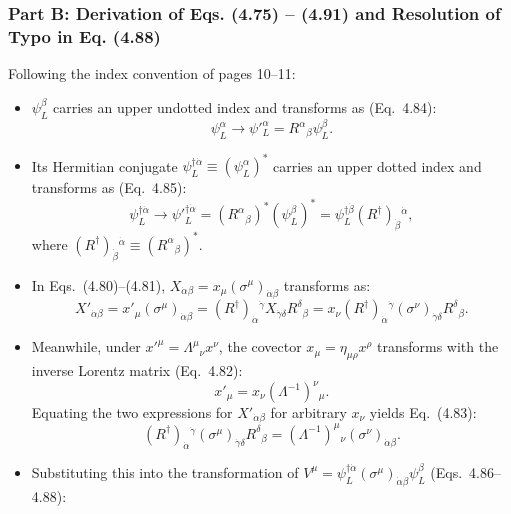 \documentclass[11pt,a4paper]{article}
\begin{document}
\subsubsection{Part B: Derivation of Eqs. (4.75) -- (4.91) and Resolution of Typo in Eq. (4.88)}
Following the index convention of pages 10--11:
\begin{itemize}
    \item $\psi_L^\beta$ carries an upper undotted index and transforms as (Eq.~4.84):
    \begin{equation}
        \psi_L^\alpha \longrightarrow \psi'^\alpha_L = R^\alpha{}_\beta \psi_L^\beta.
    \end{equation}
    \item Its Hermitian conjugate $\psi_L^{\dagger\dot{\alpha}} \equiv (\psi_L^\alpha)^*$ carries an upper dotted index and transforms as (Eq.~4.85):
    \begin{equation}
        \psi_L^{\dagger\dot{\alpha}} \longrightarrow \psi'^{\dagger\dot{\alpha}}_L = (R^\alpha{}_\beta)^* (\psi_L^\beta)^* = \psi_L^{\dagger\dot{\beta}} (R^\dagger)_{\dot{\beta}}{}^{\dot{\alpha}},
    \end{equation}
    where $(R^\dagger)_{\dot{\beta}}{}^{\dot{\alpha}} \equiv (R^\alpha{}_\beta)^*$.
    \item In Eqs.~(4.80)--(4.81), $X_{\dot{\alpha}\beta} = x_\mu (\sigma^\mu)_{\dot{\alpha}\beta}$ transforms as:
    \begin{equation}
        X'_{\dot{\alpha}\beta} = x'_\mu (\sigma^\mu)_{\dot{\alpha}\beta} = (R^\dagger)_{\dot{\alpha}}{}^{\dot{\gamma}} X_{\dot{\gamma}\delta} R^\delta{}_\beta = x_\nu (R^\dagger)_{\dot{\alpha}}{}^{\dot{\gamma}} (\sigma^\nu)_{\dot{\gamma}\delta} R^\delta{}_\beta.
    \end{equation}
    \item Meanwhile, under $x'^\mu = \Lambda^\mu{}_\nu x^\nu$, the covector $x_\mu = \eta_{\mu\rho}x^\rho$ transforms with the inverse Lorentz matrix (Eq.~4.82):
    \begin{equation}
        x'_\mu = x_\nu (\Lambda^{-1})^\nu{}_\mu.
    \end{equation}
    Equating the two expressions for $X'_{\dot{\alpha}\beta}$ for arbitrary $x_\nu$ yields Eq.~(4.83):
    \begin{equation}
        (R^\dagger)_{\dot{\alpha}}{}^{\dot{\gamma}} (\sigma^\mu)_{\dot{\gamma}\delta} R^\delta{}_\beta = (\Lambda^{-1})^\mu{}_\nu (\sigma^\nu)_{\dot{\alpha}\beta}.
    \end{equation}
    \item Substituting this into the transformation of $V^\mu = \psi_L^{\dagger\dot{\alpha}} (\sigma^\mu)_{\dot{\alpha}\beta} \psi_L^\beta$ (Eqs.~4.86--4.88):

\end{itemize}
\end{document}
